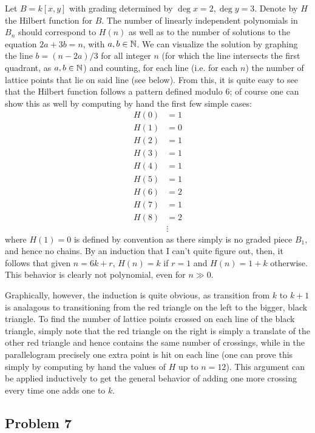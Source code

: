 \documentclass{../../mathnotes}
\begin{document}
Let $B=k[x,y]$ with grading determined by $\deg x=2, \deg y=3$. Denote by $H$ the Hilbert function for $B$. The number of linearly independent
polynomials in $B_n$ should correspond to $H(n)$ as well as to the number of solutions to the equation $2a+3b=n$, with $a,b\in\mathbb{N}$. We can visualize the solution
by graphing the line $b=(n-2a)/3$ for all integer $n$ (for which the line intersects the first quadrant, as $a,b\in\mathbb{N}$) and counting, for each line (i.e. for each $n$)
the number of lattice points that lie on said line (see below). From this, it is quite easy to see that the Hilbert function follows a pattern defined modulo 6; of course one can show this as well
by computing by hand the first few simple cases:
\begin{align*}
    H(0)&=1\\
    H(1)&=0\\
    H(2)&=1\\
    H(3)&=1\\
    H(4)&=1\\
    H(5)&=1\\
    H(6)&=2\\
    H(7)&=1\\
    H(8)&=2\\
    &\vdots
\end{align*}
where $H(1)=0$ is defined by convention as there simply is no graded piece $B_1$, and hence no chains. By an induction that I can't quite figure out, then, it follows that
given $n=6k+r$, $H(n)=k$ if $r=1$ and $H(n)=1+k$ otherwise. This behavior is clearly not polynomial, even for $n\gg 0$.

Graphically, however, the induction is quite obvious, as transition from $k$ to $k+1$ is analagous to transitioning from the red triangle on the left to the
bigger, black triangle. To find the number of lattice points crossed on each line of the black triangle, simply note that the red triangle on the right is simply a translate of
the other red triangle and hence contains the same number of crossings, while in the parallelogram precisely one extra point is hit on each line (one can prove this simply by computing
by hand the values of $H$ up to $n=12$). This argument can be applied inductively to get the general behavior of adding one more crossing every time one adds one to $k$.

\subsection*{Problem 7}
\end{document}

